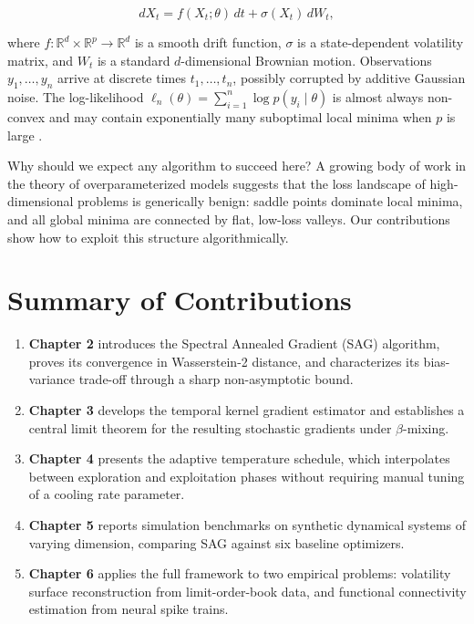 \documentclass[12pt,letterpaper,twoside]{report}
\begin{document}
\begin{equation}\label{eq:sde}
dX_{t} = f(X_{t}; \theta)\,dt + \sigma(X_{t})\,dW_{t},
\end{equation}

\noindent where $f: \mathbb{R}^{d} \times \mathbb{R}^{p} \to \mathbb{R}^{d}$ is a smooth drift function, $\sigma$ is a state-dependent volatility matrix, and $W_{t}$ is a standard $d$-dimensional Brownian motion. Observations $y_{1}, \ldots, y_{n}$ arrive at discrete times $t_{1}, \ldots, t_{n}$, possibly corrupted by additive Gaussian noise. The log-likelihood $\ell_{n}(\theta) = \sum_{i=1}^{n} \log p(y_{i} \mid \theta)$ is almost always non-convex and may contain exponentially many suboptimal local minima when $p$ is large \cite{choromanska2015}.

Why should we expect any algorithm to succeed here? A growing body of work in the theory of overparameterized models \cite{neyshabur2018,du2019} suggests that the loss landscape of high-dimensional problems is generically benign: saddle points dominate local minima, and all global minima are connected by flat, low-loss valleys. Our contributions show how to exploit this structure algorithmically.

\section{Summary of Contributions}

\begin{enumerate}[leftmargin=*,itemsep=6pt,label={\color{ChicagoMaroon}\bfseries\arabic*.}]
  \item \textbf{Chapter 2} introduces the Spectral Annealed Gradient (SAG) algorithm, proves its convergence in Wasserstein-2 distance, and characterizes its bias-variance trade-off through a sharp non-asymptotic bound.
  \item \textbf{Chapter 3} develops the temporal kernel gradient estimator and establishes a central limit theorem for the resulting stochastic gradients under $\beta$-mixing.
  \item \textbf{Chapter 4} presents the adaptive temperature schedule, which interpolates between exploration and exploitation phases without requiring manual tuning of a cooling rate parameter.
  \item \textbf{Chapter 5} reports simulation benchmarks on synthetic dynamical systems of varying dimension, comparing SAG against six baseline optimizers.
  \item \textbf{Chapter 6} applies the full framework to two empirical problems: volatility surface reconstruction from limit-order-book data, and functional connectivity estimation from neural spike trains.
\end{enumerate}
\end{document}
